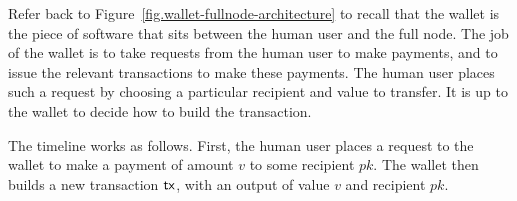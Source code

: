 Refer back to Figure~\ref{fig.wallet-fullnode-architecture} to recall that the wallet
is the piece of software that sits between the human user and the full node. The job of
the wallet is to take requests from the human user to make payments, and to issue the relevant
transactions to make these payments. The human user places such a request by choosing a particular
recipient and value to transfer. It is up to the wallet to decide how to build the transaction.

The timeline works as follows. First, the human user places a request to the wallet
to make a payment of amount $v$ to some recipient $pk$. The wallet then builds a new transaction
$\mathsf{tx}$, with an output of value $v$ and recipient $pk$. 

%
%
%
%

